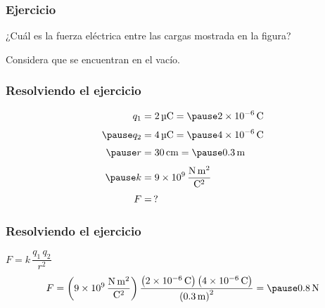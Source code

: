 \documentclass[14pt]{beamer}
\begin{document}
\begin{frame}
\frametitle{Ejercicio}
¿Cuál es la fuerza eléctrica entre las cargas mostrada en la figura?
\begin{figure}
    \centering
\end{figure}
Considera que se encuentran en el vacío.
\end{frame}
\begin{frame}
\frametitle{Resolviendo el ejercicio}
\pause
\begin{eqnarray*}
\begin{aligned}
q_{1} &= \SI{2}{\micro\coulomb} = \pause \SI{2d-6}{\coulomb} \\[0.3em] \pause
q_{2} &= \SI{4}{\micro\coulomb} = \pause \SI{4d-6}{\coulomb} \\[0.3em] \pause
r &= \SI{30}{\centi\meter} = \pause \SI{0.3}{\meter} \\[0.3em] \pause
k &= \SI[per-mode=fraction]{9d9}{\newton\square\meter\per\square\coulomb} \\[0.3em]
F &= \, ?
\end{aligned}
\end{eqnarray*}
\end{frame}
\begin{frame}
\frametitle{Resolviendo el ejercicio}
 \quad \pause $F = k \, \dfrac{q_{1} \, q_{2}}{r^{2}}$
\\[0.5em] \pause
{}
\begin{eqnarray*}
\begin{aligned}
F = \left( \SI[per-mode=fraction]{9d9}{\newton\square\meter\per\square\coulomb} \right) \dfrac{\left( \SI{2d-6}{\coulomb} \right) \left( \SI{4d-6}{\coulomb} \right)}{\left( \SI{0.3}{\meter} \right)^{2}} = \pause \SI{0.8}{\newton}
\end{aligned}
\end{eqnarray*}
\end{frame}
\end{document}
